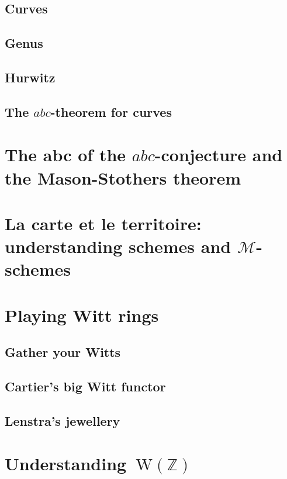 \documentclass[a4paper]{memoir}
\begin{document}
\section{Curves}
\section{Genus}
\section{Hurwitz}
\section{The $abc$-theorem for curves}



\chapter{The abc of the $abc$-conjecture and the Mason-Stothers theorem}





\chapter{La carte et le territoire: understanding schemes and $\mathcal{M}$-schemes}








\chapter{Playing Witt rings}
\section{Gather your Witts}

\section{Cartier's big Witt functor}

\section{Lenstra's jewellery}



\chapter{Understanding~$\mathrm{W}(\mathbb{Z})$}




\end{document}
